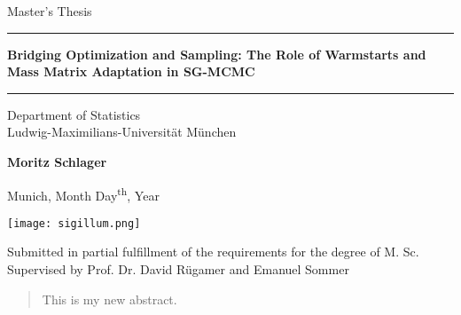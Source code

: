 \documentclass[12pt]{article}
\newcommand{\mytitle}{Bridging Optimization and Sampling: The Role of Warmstarts and Mass Matrix Adaptation in SG-MCMC}
\newcommand{\myname}{Moritz Schlager}
\newcommand{\mysupervisor}{Prof. Dr. David Rügamer and Emanuel Sommer}
\begin{document}

\begin{titlepage}
  \begin{center}

    \LARGE
    Master's Thesis

    \vspace{0.5cm}

    \rule{\textwidth}{1.5pt}
    \LARGE
    \textbf{\mytitle}
    \rule{\textwidth}{1.5pt}

    \vspace{0.5cm}

    \large
    Department of Statistics \\
    Ludwig-Maximilians-Universität München

    \vfill

    \Large
    \textbf{\myname}

    \vfill

    \large
    Munich, Month Day\textsuperscript{th}, Year

    \vfill

    \texttt{[image: sigillum.png]}

    \vfill

    \normalsize
    Submitted in partial fulfillment of the requirements for the degree of M. Sc.
    \\

    Supervised by \mysupervisor

  \end{center}
\end{titlepage}


\newpage

\begin{abstract}

  This is my new abstract.

\end{abstract}

\newpage
\tableofcontents

\newpage
\listoffigures
\newpage
\listoftables
\newpage


\end{document}
